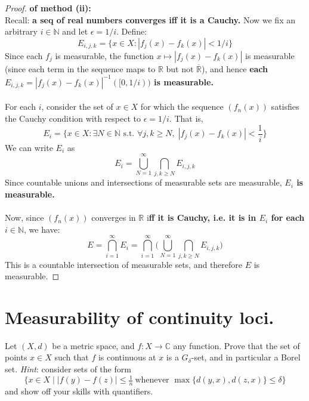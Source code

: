\documentclass[lang=cn,11pt]{elegantbook}
\begin{document}
\begin{proof}
    \textbf{of method (ii):}\\
Recall: \textbf{a seq of real numbers converges iff it is a Cauchy.}
Now we fix an arbitrary \(i\in\mathbb{N}\) and let \(\epsilon = 1/i\). Define:
\[
E_{i,j,k} = \{x\in X: |f_j(x)-f_k(x)| < 1/i\}
\]
Since each \(f_j\) is measurable, the function \(x\mapsto |f_j(x)-f_k(x)|\) is measurable (since each term in the sequence maps to $\mathbb{R}$ but not $\overline{\mathbb{R}}$), and hence \textbf{each \(E_{i,j,k} = |f_j(x)-f_k(x)|^{-1} ([0,1/i))\) is measurable.}\\\\
\noindent For each \(i\), consider the set of \(x\in X\) for which the sequence \((f_n(x))\) satisfies the Cauchy condition with respect to \(\epsilon=1/i\). That is,
\[
E_i = \Big\{x\in X:  \exists N\in\mathbb{N} \text{ s.t. } \forall j,k\ge N,\; |f_j(x)-f_k(x)|<\frac1{i}\Big\}
\]
We can write \(E_i\) as
\[
E_i = \bigcup_{N=1}^\infty \bigcap_{j,k\ge N} E_{i,j,k}
\]
Since countable unions and intersections of measurable sets are measurable, \textbf{\(E_i\) is measurable.}\\\\
\noindent Now, since \((f_n(x))\) converges in $\mathbb{R}$ i\textbf{ff it is Cauchy, i.e. it is in $E_i$ for each $i\in\mathbb{N}$}, we have:
\[
E = \bigcap_{i=1}^\infty E_i 
= \bigcap_{i=1}^\infty \Big(\bigcup_{N=1}^\infty \bigcap_{j,k\ge N} E_{i,j,k}\Big)
\]
This is a countable intersection of measurable sets, and therefore \(E\) is measurable.
\end{proof}


  
  
  \section{Measurability of continuity loci.}
    Let $(X,d)$ be a metric space, and $f\colon X\to\mathbb{C}$ any function. Prove that the set of points $x\in X$ such that $f$ is continuous at $x$ is a $G_\delta$-set, and in particular a Borel set.
    \textit{Hint}: consider sets of the form
    \[
      \{x\in X\mid |f(y)-f(z)|\le\tfrac1n\ \text{whenever $\max\{d(y,x),d(z,x)\}\le\delta$}\}
    \]
    and show off your skills with quantifiers.
\end{document}
